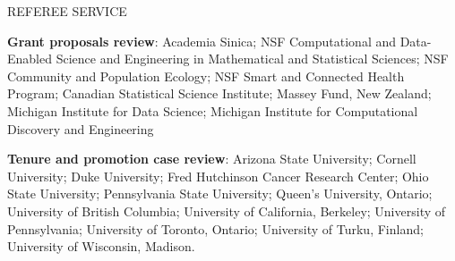 \begin{mylist}{REFEREE SERVICE}
\item {\bf Grant proposals review}:
  Academia Sinica;
NSF Computational and Data-Enabled Science and Engineering in Mathematical and Statistical Sciences;
NSF Community and Population Ecology;
NSF Smart and Connected Health Program;
Canadian Statistical Science Institute;
Massey Fund, New Zealand;
Michigan Institute for Data Science;
Michigan Institute for Computational Discovery and Engineering

\item {\bf Tenure and promotion case review}:
Arizona State University;
Cornell University;
Duke University;
Fred Hutchinson Cancer Research Center;
Ohio State University;
Pennsylvania State University;
Queen's University, Ontario;
University of British Columbia;
University of California, Berkeley;
University of Pennsylvania;
University of Toronto, Ontario;
University of Turku, Finland;
University of Wisconsin, Madison.

\end{mylist}


